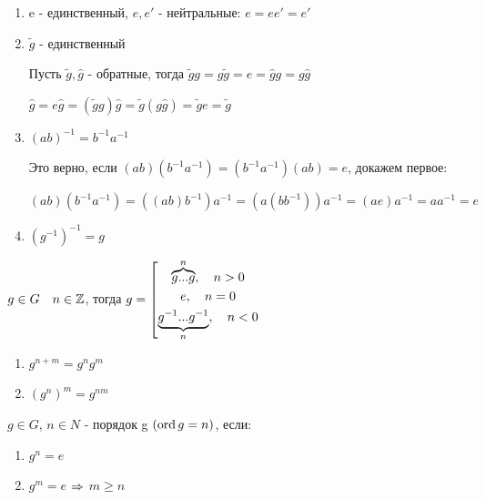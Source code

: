 \documentclass[12pt, fleqn]{article}
\begin{document}
\begin{properties}[групп]
    \begin{enumerate}  
        \item e - единственный, $e,e'$ - нейтральные: $e=e e'=e'$
        \item $\widetilde{g}$ - единственный
        
        Пусть $\widetilde{g},\hat{g}$ - обратные, тогда $\widetilde{g}g = g\widetilde{g} = e = \hat{g}g = g\hat{g}$
        
        $\hat{g}=e \hat{g}=(\widetilde{g}g)\hat{g}=\widetilde{g}(g\hat{g})=\widetilde{g}e=\widetilde{g}$
        \item $(a b)^{-1}=b^{-1}a^{-1}$
        
        Это верно, если $(ab)(b^{-1}a^{-1})=(b^{-1}a^{-1})(ab)=e$, докажем первое:
        
        $(ab)(b^{-1}a^{-1})=((ab)b^{-1})a^{-1}=(a(b b^{-1}))a^{-1}=(a e)a^{-1}=a a^{-1}=e$
        \item $(g^{-1})^{-1}=g$
    \end{enumerate} 
\end{properties}

\begin{definition}
    $g \in G \quad n \in \mathbb{Z}$, тогда $g=
\left[ 
  \begin{gathered} 
    \overbrace{g...g}^n, \quad n>0\\
    e, \quad n=0\\ 
    \underbrace{g^{-1}...g^{-1}}_n, \quad n<0
  \end{gathered} 
\right.$
\end{definition}

\begin{properties}[степени]
    \begin{enumerate}                               
    	\item $g^{n+m}=g^n g^m$
    	\item $(g^n)^m=g^{n m}$
	\end{enumerate} 
\end{properties}

\begin{definition}
    $g \in G$, $n \in N$ - порядок g $(\mathop{\rm ord}\nolimits g = n)$, если:
    \begin{enumerate}                               
    	\item $g^n=e$
    	\item $g^m=e$ $\Rightarrow$ $m \geqslant n$
	\end{enumerate} 
\end{definition}
\end{document}
